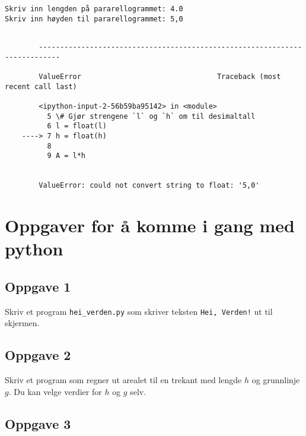 \documentclass[11pt]{article}
\begin{document}
    \begin{Verbatim}[commandchars=\\\{\}]
Skriv inn lengden på pararellogrammet: 4.0
Skriv inn høyden til pararellogrammet: 5,0
    \end{Verbatim}

    \begin{Verbatim}[commandchars=\\\{\}]

        ---------------------------------------------------------------------------

        ValueError                                Traceback (most recent call last)

        <ipython-input-2-56b59ba95142> in <module>
          5 \# Gjør strengene `l` og `h` om til desimaltall
          6 l = float(l)
    ----> 7 h = float(h)
          8 
          9 A = l*h


        ValueError: could not convert string to float: '5,0'

    \end{Verbatim}

    \hypertarget{oppgaver-for-uxe5-komme-i-gang-med-python}{%
\section{Oppgaver for å komme i gang med
python}\label{oppgaver-for-uxe5-komme-i-gang-med-python}}

    \hypertarget{oppgave-1}{%
\subsection{Oppgave 1}\label{oppgave-1}}

Skriv et program \texttt{hei\_verden.py} som skriver teksten
\texttt{Hei,\ Verden!} ut til skjermen.

    \hypertarget{oppgave-2}{%
\subsection{Oppgave 2}\label{oppgave-2}}

Skriv et program som regner ut arealet til en trekant med lengde \(h\)
og grunnlinje \(g\). Du kan velge verdier for \(h\) og \(g\) selv.

    \hypertarget{oppgave-3}{%
\subsection{Oppgave 3}\label{oppgave-3}}
\end{document}
